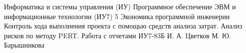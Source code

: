 \makereporttitle
{Информатика и системы управления (ИУ)}
{Программное обеспечение ЭВМ и информационные технологии (ИУ7)}
{5}
{Экономика программной инженерии}
{Контроль хода выполнения проекта с помощью средств анализа затрат. Анализ рисков по методу PERT. Работа с отчетами}
{}
{ИУ7-83Б}
{И. А. Цветков}
{М. Ю. Барышникова}
{}
{}
